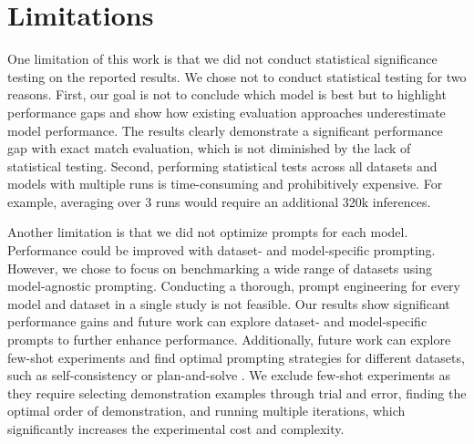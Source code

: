 \section{Limitations}
One limitation of this work is that we did not conduct statistical significance testing on the reported results.  We chose not to conduct statistical testing for two reasons. First, our goal is not to conclude which model is best but to highlight performance gaps and show how existing evaluation approaches underestimate model performance. The results clearly demonstrate a significant performance gap with exact match evaluation, which is not diminished by the lack of statistical testing. Second, performing statistical tests across all datasets and models with multiple runs is time-consuming and prohibitively expensive. For example, averaging over 3 runs would require an additional 320k inferences.

Another limitation is that we did not optimize prompts for each model. Performance could be improved with dataset- and model-specific prompting. However, we chose to focus on benchmarking a wide range of datasets using model-agnostic prompting. Conducting a thorough, prompt engineering for every model and dataset in a single study is not feasible. Our results show significant performance gains and future work can explore dataset- and model-specific prompts to further enhance performance. Additionally, future work can explore few-shot experiments and find optimal prompting strategies for different datasets, such as self-consistency \cite{wang2023selfconsistencyimproveschainthought} or plan-and-solve \cite{wang-etal-2023-plan}. We exclude few-shot experiments as they require selecting demonstration examples through trial and error, finding the optimal order of demonstration, and running multiple iterations, which significantly increases the experimental cost and complexity.








